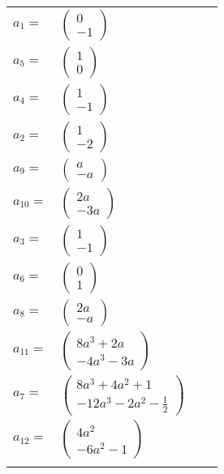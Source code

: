 \documentclass[1p]{elsarticle_modified}
\theoremstyle{definition}
\begin{document}
\begin{tabular}{m{7pt} m{180pt} m{7pt} m{180pt} }
\flushright $a_{1}=$&$\begin{pmatrix}0\\-1\end{pmatrix}$ \\
\flushright $a_{5}=$&$\begin{pmatrix}1\\0\end{pmatrix}$ \\
\flushright $a_{4}=$&$\begin{pmatrix}1\\-1\end{pmatrix}$ \\
\flushright $a_{2}=$&$\begin{pmatrix}1\\-2\end{pmatrix}$ \\
\flushright $a_{9}=$&$\begin{pmatrix}a\\- a\end{pmatrix}$ \\
\flushright $a_{10}=$&$\begin{pmatrix}2 a\\-3 a\end{pmatrix}$ \\
\flushright $a_{3}=$&$\begin{pmatrix}1\\-1\end{pmatrix}$ \\
\flushright $a_{6}=$&$\begin{pmatrix}0\\1\end{pmatrix}$ \\
\flushright $a_{8}=$&$\begin{pmatrix}2 a\\- a\end{pmatrix}$ \\
\flushright $a_{11}=$&$\begin{pmatrix}8 a^3+2 a\\-4 a^3-3 a\end{pmatrix}$ \\
\flushright $a_{7}=$&$\begin{pmatrix}8 a^3+4 a^2+1\\-12 a^3-2 a^2-\frac{1}{2}\end{pmatrix}$ \\
\flushright $a_{12}=$&$\begin{pmatrix}4 a^2\\-6 a^2-1\end{pmatrix}$\\&\end{tabular}
\end{document}
